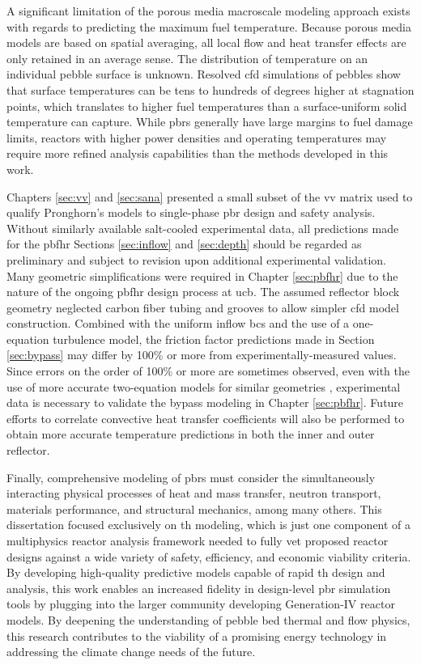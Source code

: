 A significant limitation of the porous media macroscale modeling approach exists with regards to predicting the maximum fuel temperature. Because porous media models are based on spatial averaging, all local flow and heat transfer effects are only retained in an average sense. The distribution of temperature on an individual pebble surface is unknown. Resolved \gls{cfd} simulations of pebbles show that surface temperatures can be tens to hundreds of degrees higher at stagnation points, which translates to higher fuel temperatures than a surface-uniform solid temperature can capture. While \glspl{pbr} generally have large margins to fuel damage limits, reactors with higher power densities and operating temperatures may require more refined analysis capabilities than the methods developed in this work. 

Chapters \ref{sec:vv} and \ref{sec:sana} presented a small subset of the \gls{vv} matrix used to qualify Pronghorn's models to single-phase \gls{pbr} design and safety analysis. Without similarly available salt-cooled experimental data, all predictions made for the \gls{pbfhr} Sections \ref{sec:inflow} and \ref{sec:depth} should be regarded as preliminary and subject to revision upon additional experimental validation. Many geometric simplifications were required in Chapter \ref{sec:pbfhr} due to the nature of the ongoing \gls{pbfhr} design process at \gls{ucb}. The assumed reflector block geometry neglected carbon fiber tubing and grooves to allow simpler \gls{cfd} model construction. Combined with the uniform inflow \glspl{bc} and the use of a one-equation turbulence model, the friction factor predictions made in Section \ref{sec:bypass} may differ by 100\% or more from experimentally-measured values. Since errors on the order of 100\% or more are sometimes observed, even with the use of more accurate two-equation models for similar geometries \cite{wyk}, experimental data is necessary to validate the bypass modeling in Chapter \ref{sec:pbfhr}. Future efforts to correlate convective heat transfer coefficients will also be performed to obtain more accurate temperature predictions in both the inner and outer reflector.

Finally, comprehensive modeling of \glspl{pbr} must consider the simultaneously interacting physical processes of heat and mass transfer, neutron transport, materials performance, and structural mechanics, among many others. This dissertation focused exclusively on \gls{th} modeling, which is just one component of a multiphysics reactor analysis framework needed to fully vet proposed reactor designs against a wide variety of safety, efficiency, and economic viability criteria. By developing high-quality predictive models capable of rapid \gls{th} design and analysis, this work enables an increased fidelity in design-level \gls{pbr} simulation tools by plugging into the larger community developing Generation-IV reactor models. By deepening the understanding of pebble bed thermal and flow physics, this research contributes to the viability of a promising energy technology in addressing the climate change needs of the future.